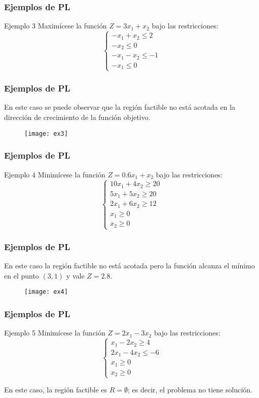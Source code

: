 \documentclass{beamer}
\begin{document}
\begin{frame}
\frametitle{Ejemplos de PL}
\begin{block}{Ejemplo 3}
Maxim\'icese la funci\'on $Z=3x_1+x_2$ bajo las restricciones:
\[\left\{\begin{array}{l}-x_1 + x_2 \leq 2 \\-x_2\leq 0 \\-x_1-x_2\leq -1 \\-x_1\leq 0\end{array}\right.\]
\end{block}
\end{frame}


\begin{frame}
\frametitle{Ejemplos de PL}
En este caso se puede observar que la regi\'on factible no est\'a acotada en la direcci\'on de crecimiento de la funci\'on objetivo.
\begin{figure}[h]
\label{fig:ejemplo 3}
\centering
\texttt{[image: ex3]}
\end{figure}
\end{frame}


\begin{frame}
\frametitle{Ejemplos de PL}
\begin{block}{Ejemplo 4}
Minim\'icese la funci\'on $Z=0.6x_1+x_2$ bajo las restricciones:
\[\left\{\begin{array}{l}10x_1 + 4x_2 \geq 20 \\5x_1+5x_2\geq 20 \\2x_1+6x_2\geq 12 \\x_1\geq 0\\ x_2\geq 0 \end{array}\right.\]
\end{block}
\end{frame}




\begin{frame}
\frametitle{Ejemplos de PL}
En este caso la regi\'on factible no est\'a acotada pero la funci\'on alcanza el m\'inimo en el punto $(3,1)$ y vale $Z=2.8$.
 \begin{figure}[h]
\label{fig:ejemplo 4}
\centering
\texttt{[image: ex4]}
\end{figure}
\end{frame}



\begin{frame}
\frametitle{Ejemplos de PL}
\begin{block}{Ejemplo 5}
Minim\'icese la funci\'on $Z=2x_1-3x_2$ bajo las restricciones:
\[\left\{\begin{array}{l}x_1-2x_2 \geq 4 \\2x_1-4x_2\leq -6 \\x_1\geq 0\\ x_2\geq 0 \end{array}\right.\]
\end{block}
En este caso, la regi\'on factible es $R=\emptyset$; es decir, el problema no tiene soluci\'on. 
\end{frame}
\end{document}

